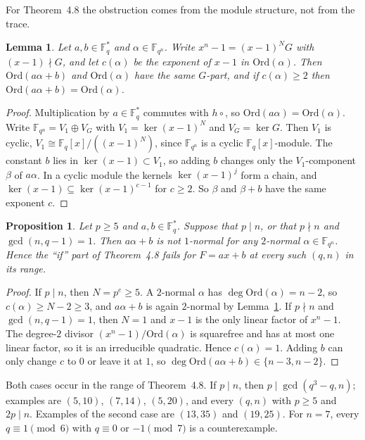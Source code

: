 \documentclass[11pt,a4paper]{amsart}
\newtheorem{lemma}[theorem]{Lemma}
\newtheorem{proposition}[theorem]{Proposition}
\theoremstyle{remark}
\newcommand{\Fq}{\mathbb{F}_q}
\newcommand{\Fqn}{\mathbb{F}_{q^n}}
\newcommand{\Ord}{\mathrm{Ord}}
\begin{document}
For Theorem~4.8 the obstruction comes from the module structure, not from the trace.

\begin{lemma}\label{lem:affine}
Let $a,b\in\Fq^*$ and $\alpha\in\Fqn$. Write $x^n-1=(x-1)^{N}G$ with $(x-1)\nmid G$, and let $c(\alpha)$ be the
exponent of $x-1$ in $\Ord(\alpha)$. Then $\Ord(a\alpha+b)$ and $\Ord(\alpha)$ have the same $G$-part, and if
$c(\alpha)\ge2$ then $\Ord(a\alpha+b)=\Ord(\alpha)$.
\end{lemma}
\begin{proof}
Multiplication by $a\in\Fq^*$ commutes with $h\circ$, so $\Ord(a\alpha)=\Ord(\alpha)$. Write
$\Fqn=V_1\oplus V_G$ with $V_1=\ker(x-1)^N$ and $V_G=\ker G$. Then $V_1$ is cyclic, $V_1\cong\Fq[x]/((x-1)^N)$, since
$\Fqn$ is a cyclic $\Fq[x]$-module. The constant $b$ lies in $\ker(x-1)\subset V_1$, so adding $b$ changes only the
$V_1$-component $\beta$ of $a\alpha$. In a cyclic module the kernels $\ker(x-1)^j$ form a chain, and
$\ker(x-1)\subseteq\ker(x-1)^{c-1}$ for $c\ge2$. So $\beta$ and $\beta+b$ have the same exponent $c$.
\end{proof}

\begin{proposition}\label{prop:affine}
Let $p\ge5$ and $a,b\in\Fq^*$. Suppose that $p\mid n$, or that $p\nmid n$ and $\gcd(n,q-1)=1$. Then $a\alpha+b$ is
not $1$-normal for any $2$-normal $\alpha\in\Fqn$. Hence the ``if'' part of Theorem~4.8 fails for $F=ax+b$ at every
such $(q,n)$ in its range.
\end{proposition}
\begin{proof}
If $p\mid n$, then $N=p^e\ge5$. A $2$-normal $\alpha$ has $\deg\Ord(\alpha)=n-2$, so $c(\alpha)\ge N-2\ge3$, and
$a\alpha+b$ is again $2$-normal by Lemma~\ref{lem:affine}. If $p\nmid n$ and $\gcd(n,q-1)=1$, then $N=1$ and $x-1$ is
the only linear factor of $x^n-1$. The degree-$2$ divisor $(x^n-1)/\Ord(\alpha)$ is squarefree and has at most one
linear factor, so it is an irreducible quadratic. Hence $c(\alpha)=1$. Adding $b$ can only change $c$ to $0$ or leave
it at $1$, so $\deg\Ord(a\alpha+b)\in\{n-3,n-2\}$.
\end{proof}

Both cases occur in the range of Theorem~4.8. If $p\mid n$, then $p\mid\gcd(q^3-q,n)$; examples are $(5,10)$,
$(7,14)$, $(5,20)$, and every $(q,n)$ with $p\ge5$ and $2p\mid n$. Examples of the second case are $(13,35)$ and
$(19,25)$. For $n=7$, every $q\equiv1\pmod 6$ with $q\equiv0$ or $-1\pmod 7$ is a counterexample.
\end{document}
